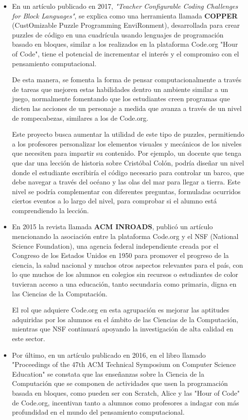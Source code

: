 \begin{itemize}
  \item En un artículo\cite{Tumlin:2017:TCC:3017680.3022467} publicado en 2017, \textit{"Teacher Configurable Coding Challenges for Block Languages"}, se explica como una herramienta llamada \textbf{COPPER} (CustOmizable Puzzle Programming EnviRonment), desarrollada para crear puzzles de código en una cuadrícula usando lenguajes de programación basado en bloques, 
  similar a los realizados en la plataforma Code.org "Hour of Code", tiene el potencial de incrementar el interés y el compromiso con el pensamiento computacional. 
  
  De esta manera, se fomenta la forma de pensar computacionalmente a través de tareas que mejoren estas habilidades dentro un ambiente similar a un juego, normalmente fomentando que los estudiantes creen programas que dicten las acciones de un personaje a medida que avanza a través de un nivel de rompecabezas, similares a los de Code.org.

  Este proyecto busca aumentar la utilidad de este tipo de puzzles, permitiendo a los profesores personalizar los elementos visuales y mecánicos de los niveles que necesiten para impartir su contenido. Por ejemplo, un docente que tenga que dar una lección de historia sobre Cristóbal Colón, podría diseñar un nivel donde el estudiante escribiría el código necesario para controlar un barco, 
  que debe navegar a través del océano y las olas del mar para llegar a tierra. Este nivel se podría complementar con diferentes preguntas, formuladas ocurridos ciertos eventos a lo largo del nivel, para comprobar si el alumno está comprendiendo la lección.
  
  \item En 2015 la revista llamada \textbf{ACM INROADS}, publicó un artículo\cite{Wilson:2015:HCB:2786608.2746406} mencionando la asociación entre la plataforma Code.org y el NSF (National Science Foundation), una agencia federal independiente creada por el Congreso de los Estados Unidos en 1950 para promover el progreso de la ciencia, la salud nacional y muchos otros aspectos 
  relevantes para el país, con lo que muchos de los alumnos en colegios sin recursos o estudiantes de color tuvieran acceso a una educación, tanto secundaria como primaria, digna en las Ciencias de la Computación.

  El rol que adquiere Code.org en esta agrupación es mejorar las aptitudes adquiridas por los alumnos en el ámbito de las Ciencias de la Computación, mientras que NSF continuará apoyando la investigación de alta calidad en este sector.
  \item Por último, en un artículo\cite{Brown:2016:PFD:2839509.2844661} publicado en 2016, en el libro llamado "Proceedings of the 47th ACM Technical Symposium on Computer Science Education"  se constata que las enseñanzas sobre la Ciencia de la Computación que se componen de actividades que usen la programación basada en bloques, como pueden ser con Scratch, 
  Alice y las "Hour of Code" de Code.org, incentivan tanto a alumnos como profesores a indagar con más profundidad en el mundo del pensamiento computacional.

\end{itemize}

